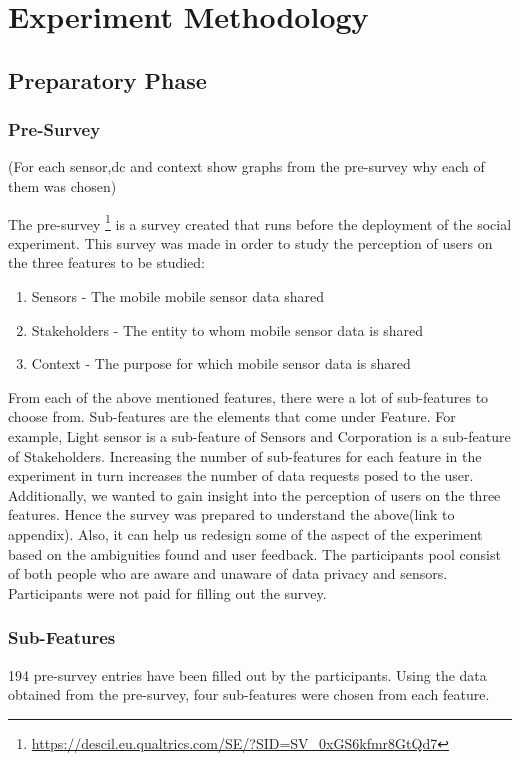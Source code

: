 \chapter{Experiment Methodology} \label{exp}

\section{Preparatory Phase}

\subsection{Pre-Survey}
(For each sensor,dc and context show graphs from the pre-survey why each of them was chosen)

The pre-survey \footnote{\url{https://descil.eu.qualtrics.com/SE/?SID=SV_0xGS6kfmr8GtQd7}} is a survey created that runs before the deployment of the social experiment. This
survey was made in order to study the perception of users on the three features to be studied:

\begin{enumerate}
    \item Sensors - The mobile mobile sensor data shared
    \item Stakeholders - The entity to whom mobile sensor data is shared
    \item Context - The purpose for which mobile sensor data is shared
\end{enumerate}

From each of the above mentioned features, there were a lot of sub-features to choose from. Sub-features are the elements that come under
Feature. For example, Light sensor is a sub-feature of Sensors and Corporation is a sub-feature of Stakeholders.
Increasing the number of sub-features for each feature in the experiment in turn increases the number of data requests posed to the user. Additionally,
we wanted to gain insight into the perception of users on the three features. Hence the survey
was prepared to understand the above(link to appendix). Also, it can help us redesign some of the aspect of the experiment based on the
ambiguities found and user feedback. The participants pool consist of both people who are aware and unaware of data privacy and sensors. Participants were not paid for filling out the survey.

\subsection{Sub-Features}
194 pre-survey entries have been filled out by the participants. Using the data obtained from the pre-survey, four sub-features were chosen from each
feature.

